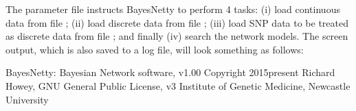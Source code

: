 \documentclass[letterpaper,10pt,english]{sphinxmanual}
\begin{document}
\sphinxAtStartPar
The parameter file instructs BayesNetty to perform 4 tasks: (i) load continuous data from file ; (ii) load discrete data from file ;
(iii) load SNP data to be treated as discrete data from file ; and finally (iv) search the network models. The screen output, which is also saved to a log file, will look something as follows:

\begin{sphinxVerbatim}[commandchars=\\\{\}]
BayesNetty: Bayesian Network software, v1.00
\PYGZhy{}\PYGZhy{}\PYGZhy{}\PYGZhy{}\PYGZhy{}\PYGZhy{}\PYGZhy{}\PYGZhy{}\PYGZhy{}\PYGZhy{}\PYGZhy{}\PYGZhy{}\PYGZhy{}\PYGZhy{}\PYGZhy{}\PYGZhy{}\PYGZhy{}\PYGZhy{}\PYGZhy{}\PYGZhy{}\PYGZhy{}\PYGZhy{}\PYGZhy{}\PYGZhy{}\PYGZhy{}\PYGZhy{}\PYGZhy{}\PYGZhy{}\PYGZhy{}\PYGZhy{}\PYGZhy{}\PYGZhy{}\PYGZhy{}\PYGZhy{}\PYGZhy{}\PYGZhy{}\PYGZhy{}\PYGZhy{}\PYGZhy{}\PYGZhy{}\PYGZhy{}\PYGZhy{}\PYGZhy{}\PYGZhy{}\PYGZhy{}\PYGZhy{}\PYGZhy{}\PYGZhy{}\PYGZhy{}\PYGZhy{}
Copyright 2015\PYGZhy{}present Richard Howey, GNU General Public License, v3
Institute of Genetic Medicine, Newcastle University


\end{sphinxVerbatim}
\end{document}
